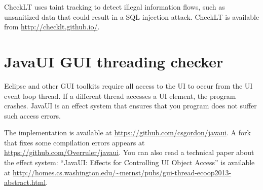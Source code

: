 CheckLT uses taint tracking to detect illegal information flows, such as
unsanitized data that could result in a SQL injection attack.
CheckLT is available from \url{http://checklt.github.io/}.


\section{JavaUI GUI threading checker\label{javaui-checker}}

Eclipse and other GUI toolkits require all access to the UI to occur from
the UI event loop thread.  If a different thread accesses a UI element, the
program crashes.  JavaUI is an effect system that ensures that you program
does not suffer such access errors.

The implementation is available at
\url{https://github.com/csgordon/javaui}.  
A fork that fixes some compilation errors appears at
\url{https://github.com/Overruler/javaui}.
You can also read a technical paper about the effect system:  ``JavaUI:
Effects for Controlling UI Object Access'' is available at
\url{http://homes.cs.washington.edu/~mernst/pubs/gui-thread-ecoop2013-abstract.html}.


